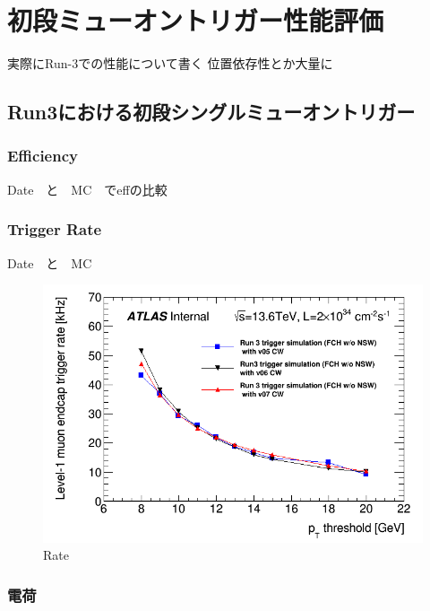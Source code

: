 \chapter{初段ミューオントリガー性能評価}
実際にRun-3での性能について書く
位置依存性とか大量に
\section{Run3における初段シングルミューオントリガー}
\subsection{Efficiency}
Date　と　MC　でeffの比較

\subsection{Trigger Rate}
Date　と　MC
\begin{figure}[tb]
  \centering
  \includegraphics[clip, width=14cm]{fig/5/l1mue_rate_run3.png}
  \caption{Rate}
  \label{fig:fit_def}
\end{figure}

\subsection{電荷}


